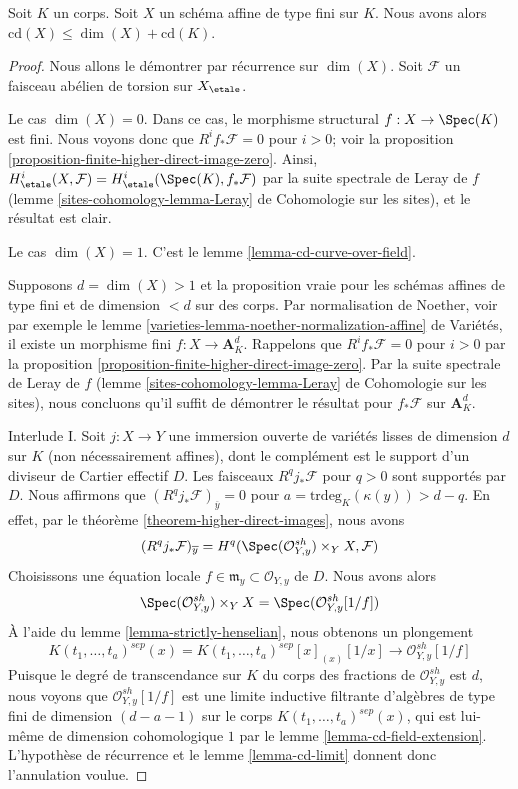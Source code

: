 \begin{proposition}
\label{proposition-cd-affine}
Soit $K$ un corps. Soit $X$ un schéma affine de type fini sur $K$.
Nous avons alors $\text{cd}(X) \leq \dim(X) + \text{cd}(K)$.
\end{proposition}

\begin{proof}
Nous allons le démontrer par récurrence sur $\dim(X)$.
Soit $\mathcal{F}$ un faisceau abélien de torsion sur $X_\etale$.

\medskip\noindent
Le cas $\dim(X) = 0$. Dans ce cas, le morphisme structural
$f : X \to \Spec(K)$ est fini. Nous voyons donc que $R^if_*\mathcal{F} = 0$
pour $i > 0$; voir la proposition \ref{proposition-finite-higher-direct-image-zero}.
Ainsi, $H^i_\etale(X, \mathcal{F}) = H^i_\etale(\Spec(K), f_*\mathcal{F})$
par la suite spectrale de Leray de $f$
(lemme \ref{sites-cohomology-lemma-Leray} de Cohomologie sur les sites),
et le résultat est clair.

\medskip\noindent
Le cas $\dim(X) = 1$. C'est le lemme \ref{lemma-cd-curve-over-field}.

\medskip\noindent
Supposons $d = \dim(X) > 1$ et la proposition vraie pour les schémas
affines de type fini et de dimension $< d$ sur des corps.
Par normalisation de Noether, voir par exemple le
lemme \ref{varieties-lemma-noether-normalization-affine} de Variétés,
il existe un morphisme fini $f : X \to \mathbf{A}^d_K$.
Rappelons que $R^if_*\mathcal{F} = 0$ pour $i > 0$ par la
proposition \ref{proposition-finite-higher-direct-image-zero}.
Par la suite spectrale de Leray de $f$
(lemme \ref{sites-cohomology-lemma-Leray} de Cohomologie sur les sites),
nous concluons qu'il suffit de démontrer le résultat pour $f_*\mathcal{F}$
sur $\mathbf{A}^d_K$.

\medskip\noindent
Interlude I. Soit $j : X \to Y$ une immersion ouverte de variétés lisses
de dimension $d$ sur $K$ (non nécessairement affines),
dont le complément est le support d'un diviseur de Cartier effectif $D$.
Les faisceaux $R^qj_*\mathcal{F}$ pour $q > 0$ sont supportés par $D$.
Nous affirmons que $(R^qj_*\mathcal{F})_{\overline{y}} = 0$
pour $a = \text{trdeg}_K(\kappa(y)) > d - q$. En effet, par le
théorème \ref{theorem-higher-direct-images}, nous avons
$$
(R^qj_*\mathcal{F})_{\overline{y}} =
H^q(\Spec(\mathcal{O}_{Y, y}^{sh}) \times_Y X, \mathcal{F})
$$
Choisissons une équation locale $f \in \mathfrak m_y \subset \mathcal{O}_{Y, y}$
de $D$. Nous avons alors
$$
\Spec(\mathcal{O}_{Y, y}^{sh}) \times_Y X =
\Spec(\mathcal{O}_{Y, y}^{sh}[1/f])
$$
À l'aide du lemme \ref{lemma-strictly-henselian}, nous obtenons un plongement
$$
K(t_1, \ldots, t_a)^{sep}(x) =
K(t_1, \ldots, t_a)^{sep}[x]_{(x)}[1/x]
\longrightarrow
\mathcal{O}_{Y, y}^{sh}[1/f]
$$
Puisque le degré de transcendance sur $K$ du corps des fractions de
$\mathcal{O}_{Y, y}^{sh}$ est $d$, nous voyons que $\mathcal{O}_{Y, y}^{sh}[1/f]$
est une limite inductive filtrante d'algèbres de type fini de dimension $(d - a - 1)$ sur
le corps $K(t_1, \ldots, t_a)^{sep}(x)$, qui est lui-même de
dimension cohomologique $1$ par le lemme \ref{lemma-cd-field-extension}. L'hypothèse
de récurrence et le lemme \ref{lemma-cd-limit}
donnent donc l'annulation voulue.


\end{proof}
